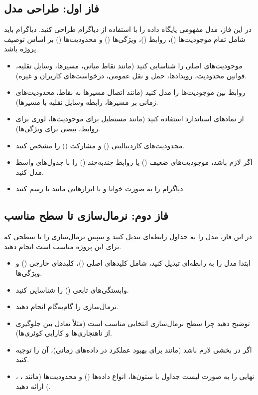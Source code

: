 \documentclass[12pt,a4paper]{article}
\begin{document}
\subsection{فاز اول: طراحی مدل }
در این فاز، مدل مفهومی پایگاه داده را با استفاده از دیاگرام  طراحی کنید. دیاگرام باید شامل تمام موجودیت‌ها ()، روابط ()، ویژگی‌ها () و محدودیت‌ها () بر اساس توصیف پروژه باشد.
\begin{itemize}
\item موجودیت‌های اصلی را شناسایی کنید (مانند نقاط میانی، مسیرها، وسایل نقلیه، قوانین محدودیت، رویدادها، حمل و نقل عمومی، درخواست‌های کاربران و غیره).
\item روابط بین موجودیت‌ها را مدل کنید (مانند اتصال مسیرها به نقاط، محدودیت‌های زمانی بر مسیرها، رابطه وسایل نقلیه با مسیرها).
\item از نمادهای استاندارد  استفاده کنید (مانند مستطیل برای موجودیت‌ها، لوزی برای روابط، بیضی برای ویژگی‌ها).
\item محدودیت‌های کاردینالیتی () و مشارکت () را مشخص کنید.
\item اگر لازم باشد، موجودیت‌های ضعیف () یا روابط چندبه‌چند () را با جدول‌های واسط مدل کنید.
\item دیاگرام را به صورت خوانا و با ابزارهایی مانند  یا  رسم کنید.
\end{itemize}

\subsection{فاز دوم: نرمال‌سازی تا سطح مناسب}
در این فاز، مدل  را به جداول رابطه‌ای تبدیل کنید و سپس نرمال‌سازی را تا سطحی که برای این پروژه مناسب است انجام دهید.
\begin{itemize}
\item ابتدا مدل  را به  رابطه‌ای تبدیل کنید، شامل کلیدهای اصلی ()، کلیدهای خارجی () و ویژگی‌ها.
\item وابستگی‌های تابعی () را شناسایی کنید.
\item نرمال‌سازی را گام‌به‌گام انجام دهید.
\item توضیح دهید چرا سطح نرمال‌سازی انتخابی مناسب است (مثلاً تعادل بین جلوگیری از ناهنجاری‌ها و کارایی کوئری‌ها).
\item اگر  در بخشی لازم باشد (مانند برای بهبود عملکرد در داده‌های زمانی)، آن را توجیه کنید.
\item {} نهایی را به صورت لیست جداول با ستون‌ها، انواع داده‌ها () و محدودیت‌ها (مانند ، ، ) ارائه دهید.
\end{itemize}
\end{document}
